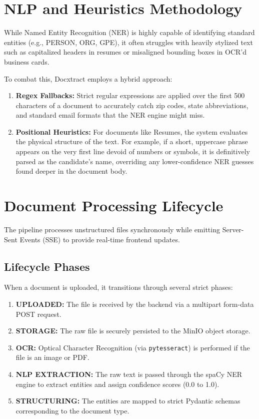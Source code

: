 \documentclass[12pt,a4paper]{article}
\begin{document}
\newpage

\section{NLP and Heuristics Methodology}
While Named Entity Recognition (NER) is highly capable of identifying standard entities (e.g., PERSON, ORG, GPE), it often struggles with heavily stylized text such as capitalized headers in resumes or misaligned bounding boxes in OCR'd business cards. 

To combat this, Docxtract employs a hybrid approach:
\begin{enumerate}
    \item \textbf{Regex Fallbacks:} Strict regular expressions are applied over the first 500 characters of a document to accurately catch zip codes, state abbreviations, and standard email formats that the NER engine might miss.
    \item \textbf{Positional Heuristics:} For documents like Resumes, the system evaluates the physical structure of the text. For example, if a short, uppercase phrase appears on the very first line devoid of numbers or symbols, it is definitively parsed as the candidate's name, overriding any lower-confidence NER guesses found deeper in the document body.
\end{enumerate}

\section{Document Processing Lifecycle}
The pipeline processes unstructured files synchronously while emitting Server-Sent Events (SSE) to provide real-time frontend updates. 

\subsection{Lifecycle Phases}
When a document is uploaded, it transitions through several strict phases:
\begin{enumerate}
    \item \textbf{UPLOADED:} The file is received by the backend via a multipart form-data POST request.
    \item \textbf{STORAGE:} The raw file is securely persisted to the MinIO object storage.
    \item \textbf{OCR:} Optical Character Recognition (via \texttt{pytesseract}) is performed if the file is an image or PDF.
    \item \textbf{NLP EXTRACTION:} The raw text is passed through the spaCy NER engine to extract entities and assign confidence scores (0.0 to 1.0).
    \item \textbf{STRUCTURING:} The entities are mapped to strict Pydantic schemas corresponding to the document type.
\end{enumerate}
\end{document}
